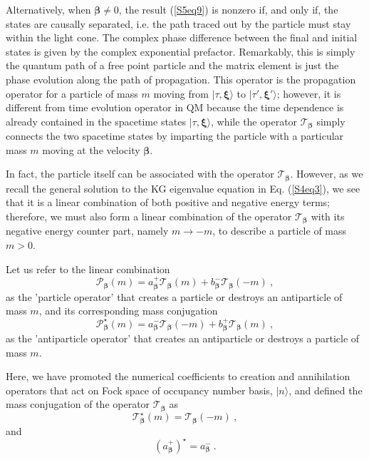 \documentclass[12pt]{iopart}
\begin{document}
Alternatively, when $\boldsymbol{\beta}\neq 0$, the result (\ref{S5eq9}) is nonzero if, 
and only if, the states are causally separated, i.e. the path traced out by the particle must 
stay within the light cone.  The complex phase difference between the final and initial 
states is given by the complex exponential prefactor. Remarkably, this is simply the 
quantum path of a free point particle and the matrix element is just the phase evolution 
along the path of propagation. This operator is the propagation operator for a particle 
of mass $m$ moving from $\vert\tau,\boldsymbol{\xi}\rangle$ to $\vert\tau',
\boldsymbol{\xi}'\rangle$; however, it is different from time evolution operator 
in QM because the time dependence is already contained in the spacetime states 
$\vert\tau,\boldsymbol{\xi}\rangle$, while the operator $\mathcal{T}_{\boldsymbol
{\beta}}$ simply connects the two spacetime states by imparting the particle with 
a particular mass $m$ moving at the velocity $\boldsymbol{\beta}$.  

In fact, the particle itself can be associated with the operator $\mathcal{T}_{\boldsymbol
{\beta}}$. However, as we recall the general solution to the KG eigenvalue equation in Eq. 
(\ref{S4eq3}), we see that it is a linear combination of both positive and negative energy terms; 
therefore, we must also form a linear combination of the operator $\mathcal{T}_{\boldsymbol
{\beta}}$ with its negative energy counter part, namely $m\to-m$, to describe a particle of 
mass $m>0$. 
%

Let us refer to the linear combination 
%
    \begin{equation}
        \mathcal{P}_{\boldsymbol{\beta}}(m)=
        a^{+}_{\boldsymbol{\beta}}\mathcal{T}_{\boldsymbol{\beta}}(m)+
        b^{-}_{\boldsymbol{\beta}}\mathcal{T}_{\boldsymbol{\beta}}(-m)\ ,
        \label{S5eq11}
    \end{equation}
%
as the 'particle operator' that creates a particle or destroys an antiparticle of mass $m$, 
and its corresponding mass conjugation 
%
    \begin{equation}
        \mathcal{P}^{\star}_{\boldsymbol{\beta}}(m)=
        a^{-}_{\boldsymbol{\beta}}\mathcal{T}_{\boldsymbol{\beta}}(-m)+
        b^{+}_{\boldsymbol{\beta}}\mathcal{T}_{\boldsymbol{\beta}}(m)\ ,
        \label{S5eq12}
    \end{equation}
%
as the 'antiparticle operator' that creates an antiparticle or destroys a particle of mass $m$. 

Here, we have promoted the numerical coefficients to creation and annihilation operators 
that act on Fock space of occupancy number basis, $\vert n\rangle$, and defined the mass 
conjugation of the operator $\mathcal{T}_{\boldsymbol{\beta}}$ as
%
    \begin{equation}
        \mathcal{T}^{\star}_{\boldsymbol{\beta}}(m)=\mathcal{T}_{\boldsymbol{\beta}}(-m)\ ,
        \label{S5eq13}
    \end{equation}
%
and
%
    \begin{equation}
        (a^{+}_{\boldsymbol{\beta}})^{\star}=a^{-}_{\boldsymbol{\beta}}\ .
    \end{equation}
%
\end{document}
